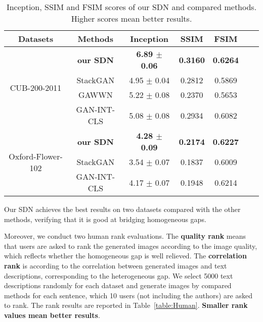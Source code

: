 \documentclass[sigconf]{acmart}
\begin{document}
\begin{table}[htb]
	\caption{Inception, SSIM and FSIM scores of our SDN and compared methods. Higher scores mean better results. }
	\begin{center}
		\begin{tabular}{|c|c|c|c|c|c|c|} 
			\hline
			Datasets & Methods & Inception & SSIM & FSIM\\
			\hline
			
			\multirow{4}{1.5cm}{CUB-200-2011} & \textbf{our SDN} & \textbf{6.89 $\pm$ 0.06} & \textbf{0.3160} & \textbf{0.6264} \\
			& StackGAN & 4.95 $\pm$ 0.04 & 0.2812 & 0.5869 \\
			& GAWWN & 5.22 $\pm$ 0.08 & 0.2370 & 0.5653 \\
			& GAN-INT-CLS & 5.08 $\pm$ 0.08 & 0.2934 & 0.6082 \\
			\hline
			
			\multirow{3}{1.5cm}{Oxford-Flower-102} & \textbf{our SDN} & \textbf{4.28 $\pm$ 0.09} & \textbf{0.2174} & \textbf{0.6227} \\
			& StackGAN & 3.54 $\pm$ 0.07 & 0.1837 & 0.6009 \\
			& GAN-INT-CLS & 4.17 $\pm$ 0.07 & 0.1948 & 0.6214 \\
			\hline
		\end{tabular} 
	\end{center}
	\label{table:Inception}
\end{table}

Our SDN achieves the best results on two datasets compared with the other methods, verifying that it is good at bridging homogeneous gaps.

Moreover, we conduct two human rank evaluations. The \textbf{quality rank} means that users are asked to rank the generated images according to the image quality, which reflects whether the homogeneous gap is well relieved. The \textbf{correlation rank} is according to the correlation between generated images and text descriptions, corresponding to the heterogeneous gap. We select 5000 text descriptions randomly for each dataset and generate images by compared methods for each sentence, which 10 users (not including the authors) are asked to rank. The rank results are reported in Table~\ref{table:Human}. \textbf{Smaller rank values mean better results}.
\end{document}
